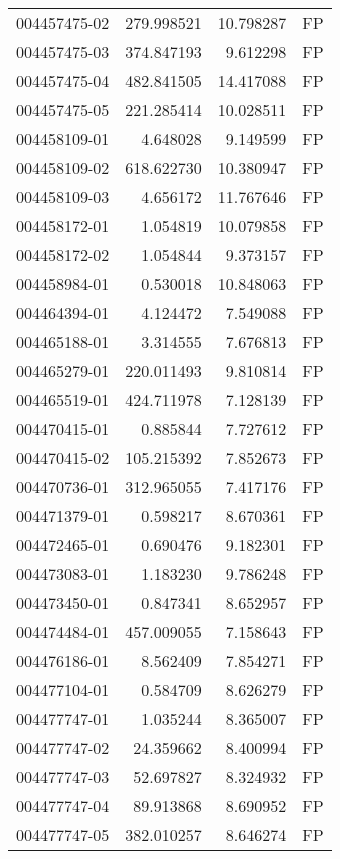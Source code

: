 \begin{tabular}{lrrl}
004457475-02 &  279.998521 &    10.798287 &   FP \\
004457475-03 &  374.847193 &     9.612298 &   FP \\
004457475-04 &  482.841505 &    14.417088 &   FP \\
004457475-05 &  221.285414 &    10.028511 &   FP \\
004458109-01 &    4.648028 &     9.149599 &   FP \\
004458109-02 &  618.622730 &    10.380947 &   FP \\
004458109-03 &    4.656172 &    11.767646 &   FP \\
004458172-01 &    1.054819 &    10.079858 &   FP \\
004458172-02 &    1.054844 &     9.373157 &   FP \\
004458984-01 &    0.530018 &    10.848063 &   FP \\
004464394-01 &    4.124472 &     7.549088 &   FP \\
004465188-01 &    3.314555 &     7.676813 &   FP \\
004465279-01 &  220.011493 &     9.810814 &   FP \\
004465519-01 &  424.711978 &     7.128139 &   FP \\
004470415-01 &    0.885844 &     7.727612 &   FP \\
004470415-02 &  105.215392 &     7.852673 &   FP \\
004470736-01 &  312.965055 &     7.417176 &   FP \\
004471379-01 &    0.598217 &     8.670361 &   FP \\
004472465-01 &    0.690476 &     9.182301 &   FP \\
004473083-01 &    1.183230 &     9.786248 &   FP \\
004473450-01 &    0.847341 &     8.652957 &   FP \\
004474484-01 &  457.009055 &     7.158643 &   FP \\
004476186-01 &    8.562409 &     7.854271 &   FP \\
004477104-01 &    0.584709 &     8.626279 &   FP \\
004477747-01 &    1.035244 &     8.365007 &   FP \\
004477747-02 &   24.359662 &     8.400994 &   FP \\
004477747-03 &   52.697827 &     8.324932 &   FP \\
004477747-04 &   89.913868 &     8.690952 &   FP \\
004477747-05 &  382.010257 &     8.646274 &   FP \\

\end{tabular}
